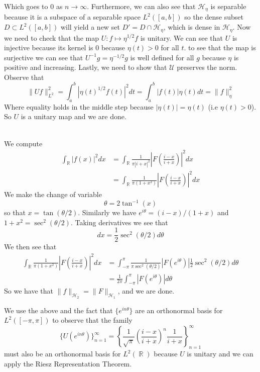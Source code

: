 \documentclass{article}
\DeclareMathOperator{\R}{\mathbb{R}}
\newcommand{\problem}[1]{\noindent{\textbf{Problem #1}}\\}
\newcommand{\problempart}[1]{\noindent{\textbf{(#1)}}}
\newcommand{\norm}[1]{\|#1\|}
\begin{document}
Which goes to $0$ as $n \to \infty$. Furthermore, we can also see that $\mathcal{H}_\eta$ is separable because it is a subspace of a separable space $L^2([a,b])$ so the dense subset $D \subset L^{2}([a,b])$ will yield a new set $D' = D \cap \mathcal{H}_\eta$, which is dense in $\mathcal{H}_\eta$. Now we need to check that the map $U: f \mapsto \eta^{1/2}f$ is unitary. We can see that $U$ is injective because its kernel is $0$ because $\eta(t) > 0$ for all $t$. to see that the map is surjective we can see that $U^{-1}g = \eta^{-1/2}g$ is well defined for all $g$ because $\eta$ is positive and increasing. Lastly, we need to show that $\mathcal{U}$ preserves the norm. Observe that
\[
\norm{Uf}_{L^2}^2 = \int_a^b |\eta(t)^{1/2}f(t)|^{2}dt = \int_a^b |f(t)|\eta(t)dt = \norm{f}_\eta^2
\]
Where equality holds in the middle step because $|\eta(t)| = \eta(t)$ (i.e $\eta(t) > 0$). So $U$ is a unitary map and we are done. 
 
\problem{4.7.9}
\problempart{a} We compute
\begin{align*}
\int_{\R} |f(x)|^2dx &= \int_{\R} \frac{1}{\pi |i+x|^2}\left| F\left(\frac{i-x}{i+x}\right)\right|^2dx \\
&= \int_{\R} \frac{1}{\pi (1 + x^2)}\left| F\left(\frac{i-x}{i+x}\right)\right|^2dx
\end{align*}
We make the change of variable 
\[
\theta = 2\tan^{-1}(x)
\]
so that $x = \tan(\theta/2)$. Similarly we have $e^{i\theta}= (i-x)/(1+x)$ and $1+x^2 = \sec^2(\theta/2)$. Taking derivatives we see that 
\[
dx = \frac{1}{2}\sec^2(\theta/2)d\theta
\] We then see that
\begin{align*}
\int_{\R} \frac{1}{\pi (1 + x^2)}\left| F\left(\frac{i-x}{i+x}\right)\right|^2dx &= \int_{-\pi}^\pi \frac{1}{\pi\sec^2(\theta/2)}|F(e^{i\theta})|\frac{1}{2}\sec^2(\theta/2)d\theta \\
&= \frac{1}{2\pi}\int_{-\pi}^\pi |F(e^{i\theta})|d\theta
\end{align*}
So we have that $\norm{f}_{\mathcal{H}_2} = \norm{F}_{\mathcal{H}_1}$, and we are done. 

\problempart{b} We use the above and the fact that $\{e^{in\theta}\}$ are an orthonormal basis for $L^2([-\pi, \pi])$ to observe that the family
\[
\{U(e^{in\theta})\}_{n=1}^{\infty} = \left\{ \frac{1}{\sqrt{\pi}}\left(\frac{i-x}{i+x}\right)^n\frac{1}{i+x}\right\}_{n=1}^\infty
\]
must also be an orthonormal basis for $L^2(\R)$ because $U$ is unitary and we can apply the Riesz Representation Theorem.
\end{document}
